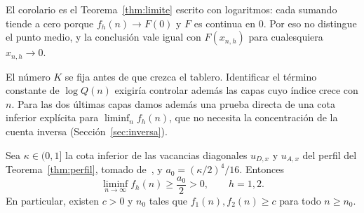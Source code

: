 El corolario es el Teorema~\ref{thm:limite} escrito con logaritmos: cada sumando tiende a cero
porque $f_h(n)\to F(0)$ y $F$ es continua en $0$. Por eso no distingue el punto medio, y la
conclusión vale igual con $F(x_{n,h})$ para cualesquiera $x_{n,h}\to0$.

El número $K$ se fija antes de que crezca el tablero. Identificar el término
constante de $\log Q(n)$ exigiría controlar además las capas cuyo índice crece
con $n$. Para las dos últimas capas damos además una prueba directa de una cota inferior
explícita para $\liminf_nf_h(n)$, que no necesita la concentración de la cuenta inversa
(Sección~\ref{sec:inversa}).

\begin{teorema}\label{thm:positiva}
Sea $\kappa\in(0,1]$ la cota inferior de las vacancias diagonales $u_{D,x}$ y $u_{A,x}$ del perfil
del Teorema~\ref{thm:perfil}, tomado de~\cite{Perfil}, y $a_0=(\kappa/2)^4/16$. Entonces
\[
 \liminf_{n\to\infty}f_h(n)\ge\frac{a_0}{2}>0,\qquad h=1,2.
\]
En particular, existen $c>0$ y $n_0$ tales que $f_1(n),f_2(n)\ge c$ para todo $n\ge n_0$.
\end{teorema}
